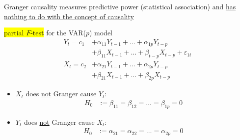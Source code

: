 \documentclass[11pt]{article}
\begin{document}
            \begin{remark}
                Granger causality measures predictive power (statistical association) and \ul{has nothing to do with the concept of causality}
            \end{remark}
            
            \begin{remark} \hl{partial $F$-test} for the VAR($p$) model
                \begin{align}
                    Y_t = c_1 &+ \alpha_{11} Y_{t-1} + \dots + \alpha_{1p} Y_{t-p} \\
                    &+ \beta_{11} X_{t-1} + \dots + \beta_{t-p}X_{t-p} + \varepsilon_{1t} \\
                    X_t = c_2 &+ \alpha_{21} Y_{t-1} + \dots + \alpha_{2p} Y_{t-p} \\
                    &+ \beta_{21} X_{t-1} + \dots + \beta_{2p} X_{t-p}
                \end{align}
                \begin{itemize}
                    \item $X_t$ does \ul{not} Granger cause $Y_t$:
                        \begin{align}
                            H_0 &:= \beta_{11} = \beta_{12} = \dots = \beta_{1p} = 0
                        \end{align}
                    \item $Y_t$ does \ul{not} Granger cause $X_t$:
                        \begin{align}
                            H_0 &:= \alpha_{21} = \alpha_{22} = \dots = \alpha_{2p} = 0
                        \end{align}
                \end{itemize}
            \end{remark}
            
\end{document}
